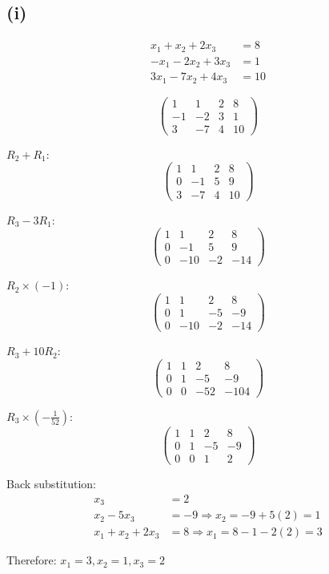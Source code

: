 \subsection*{(i)}
\begin{align*}
	x_1 + x_2 + 2x_3   & = 8  \\
	-x_1 - 2x_2 + 3x_3 & = 1  \\
	3x_1 - 7x_2 + 4x_3 & = 10
\end{align*}

\[
	\left(\begin{array}{ccc|c}
			1  & 1  & 2 & 8  \\
			-1 & -2 & 3 & 1  \\
			3  & -7 & 4 & 10
		\end{array}\right)
\]

$R_2 + R_1$:
\[
	\left(\begin{array}{ccc|c}
			1 & 1   & 2  & 8   \\
			0 & -1  & 5  & 9   \\
			3  & -7 & 4 & 10
		\end{array}\right)
\]

$R_3 - 3R_1$:
\[
	\left(\begin{array}{ccc|c}
			1 & 1   & 2  & 8   \\
			0 & -1  & 5  & 9   \\
			0 & -10 & -2 & -14
		\end{array}\right)
\]

$R_2 \times (-1)$:
\[
	\left(\begin{array}{ccc|c}
			1 & 1   & 2  & 8   \\
			0 & 1   & -5 & -9  \\
			0 & -10 & -2 & -14
		\end{array}\right)
\]

$R_3 + 10R_2$:
\[
	\left(\begin{array}{ccc|c}
			1 & 1 & 2   & 8    \\
			0 & 1 & -5  & -9   \\
			0 & 0 & -52 & -104
		\end{array}\right)
\]

$R_3 \times (-\frac{1}{52})$:
\[
	\left(\begin{array}{ccc|c}
			1 & 1 & 2  & 8  \\
			0 & 1 & -5 & -9 \\
			0 & 0 & 1  & 2
		\end{array}\right)
\]

Back substitution:
\begin{align*}
	x_3 &= 2 \\
	x_2 - 5x_3 &= -9 \Rightarrow x_2 = -9 + 5(2) = 1 \\
	x_1 + x_2 + 2x_3 &= 8 \Rightarrow x_1 = 8 - 1 - 2(2) = 3
\end{align*}

Therefore: $x_1 = 3, x_2 = 1, x_3 = 2$